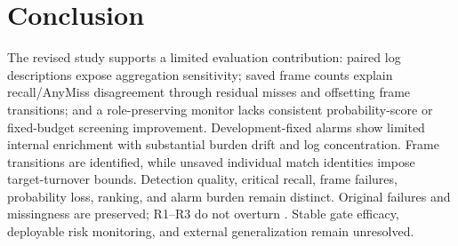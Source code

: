 \documentclass[conference]{IEEEtran}
\newcommand{\code}[1]{\texttt{\detokenize{#1}}}
\begin{document}
\section{Conclusion}
The revised study supports a limited evaluation contribution: paired log descriptions expose aggregation sensitivity; saved frame counts explain recall/AnyMiss disagreement through residual misses and offsetting frame transitions; and a role-preserving monitor lacks consistent probability-score or fixed-budget screening improvement. Development-fixed alarms show limited internal enrichment with substantial burden drift and log concentration. Frame transitions are identified, while unsaved individual match identities impose target-turnover bounds. Detection quality, critical recall, frame failures, probability loss, ranking, and alarm burden remain distinct. Original failures and missingness are preserved; R1--R3 do not overturn \code{NO_PROMOTION}. Stable gate efficacy, deployable risk monitoring, and external generalization remain unresolved.

\balance


\end{document}

